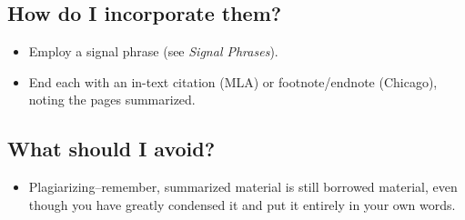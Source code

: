 \subsection{How do I incorporate them?}

\begin{itemize}
\item Employ a signal phrase (see \emph{Signal Phrases}).

\item End each with an in-text citation (MLA) or footnote/endnote (Chicago), noting 
the pages summarized.
\end{itemize}

\subsection{What should I avoid?}
\begin{itemize}

\item Plagiarizing--remember, summarized material is still borrowed material, even 
though you have greatly condensed it and put it entirely in your own words.
 \end{itemize}

